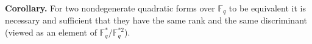 \textbf{Corollary.} For two nondegenerate quadratic forms over $\mathbb{F}_q$ to be equivalent it is necessary and sufficient that they have the same rank and the same discriminant (viewed as an element of $\mathbb{F}_q^*/\mathbb{F}_q^{*2}$).
